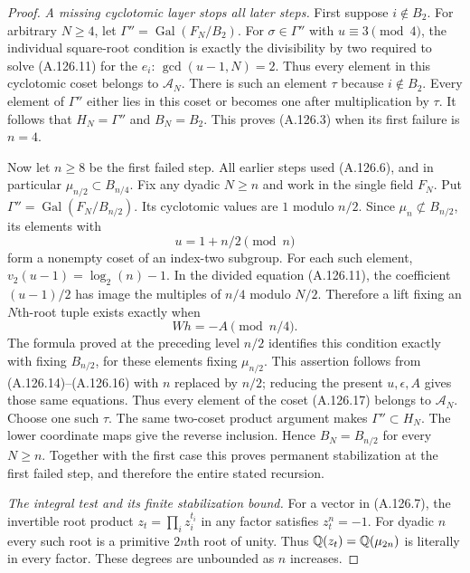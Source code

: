 \begin{proof}
\emph{A missing cyclotomic layer stops all later steps.}
First suppose $i\notin B_2$.
For arbitrary $N\ge4$, let
$\Gamma''=\operatorname{Gal}(F_N/B_2)$.
For $\sigma\in\Gamma''$ with $u\equiv3\pmod4$,
the individual square-root condition is exactly the
divisibility by two required to solve (A.126.11)
for the $e_i$: $\gcd(u-1,N)=2$.
Thus every element in this cyclotomic coset belongs
to $\mathcal A_N$.
There is such an element $\tau$ because $i\notin B_2$.
Every element of $\Gamma''$ either lies in this
coset or becomes one after multiplication by $\tau$.
It follows that $H_N=\Gamma''$ and $B_N=B_2$.
This proves (A.126.3) when its first failure is $n=4$.

Now let $n\ge8$ be the first failed step.
All earlier steps used (A.126.6), and in particular
$\mu_{n/2}\subset B_{n/4}$.
Fix any dyadic $N\ge n$ and work in the single field
$F_N$.  Put
$\Gamma''=\operatorname{Gal}(F_N/B_{n/2})$.
Its cyclotomic values are $1$ modulo $n/2$.
Since $\mu_n\not\subset B_{n/2}$, its elements
with
\[
                         u=1+n/2\pmod n
\tag{A.126.17}
\]
form a nonempty coset of an index-two subgroup.
For each such element, $v_2(u-1)=\log_2(n)-1$.
In the divided equation (A.126.11), the coefficient
$(u-1)/2$ has image the multiples of $n/4$ modulo
$N/2$.  Therefore a lift fixing an $N$th-root tuple
exists exactly when
\[
                              Wh=-A\pmod{n/4}.
\tag{A.126.18}
\]
The formula proved at the preceding level $n/2$
identifies this condition exactly with fixing
$B_{n/2}$, for these elements fixing $\mu_{n/2}$.
This assertion follows from (A.126.14)--(A.126.16)
with $n$ replaced by $n/2$; reducing the present
$u,\epsilon,A$ gives those same equations.
Thus every element of the coset (A.126.17) belongs
to $\mathcal A_N$.
Choose one such $\tau$.  The same two-coset product
argument makes $\Gamma''\subset H_N$.
The lower coordinate maps give the reverse inclusion.
Hence $B_N=B_{n/2}$ for every $N\ge n$.
Together with the first case this proves permanent
stabilization at the first failed step, and therefore
the entire stated recursion.

\emph{The integral test and its finite stabilization bound.}
For a vector in (A.126.7), the invertible root product
$z_t=\prod_i z_i^{t_i}$ in any factor satisfies
$z_t^n=-1$.
For dyadic $n$ every such root is a primitive
$2n$th root of unity.
Thus $\mathbb Q(z_t)=\mathbb Q(\mu_{2n})$ is literally in every
factor.  These degrees are unbounded as $n$ increases.


\end{proof}
